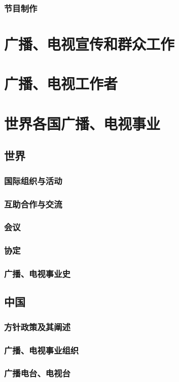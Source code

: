 \documentclass[UTF8]{../../ApplicationUniverse}
\begin{document}
    \subsubsection{节目制作}
\section{广播、电视宣传和群众工作}
\section{广播、电视工作者}
\section{世界各国广播、电视事业}
    \subsection{世界}
        \subsubsection{国际组织与活动}
        \subsubsection{互助合作与交流}
        \subsubsection{会议}
        \subsubsection{协定}
        \subsubsection{广播、电视事业史}
    \subsection{中国}
        \subsubsection{方针政策及其阐述}
        \subsubsection{广播、电视事业组织}
        \subsubsection{广播电台、电视台}
\end{document}
